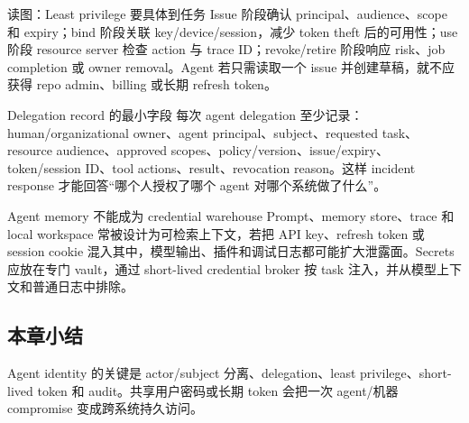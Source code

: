 
\begin{knowledgebox}{读图：Least privilege 要具体到任务}
Issue 阶段确认 principal、audience、scope 和 expiry；bind 阶段关联 key/device/session，减少 token theft 后的可用性；use 阶段 resource server 检查 action 与 trace ID；revoke/retire 阶段响应 risk、job completion 或 owner removal。Agent 若只需读取一个 issue 并创建草稿，就不应获得 repo admin、billing 或长期 refresh token。
\end{knowledgebox}

\begin{importantbox}{Delegation record 的最小字段}
每次 agent delegation 至少记录：human/organizational owner、agent principal、subject、requested task、resource audience、approved scopes、policy/version、issue/expiry、token/session ID、tool actions、result、revocation reason。这样 incident response 才能回答“哪个人授权了哪个 agent 对哪个系统做了什么”。
\end{importantbox}

\begin{warningbox}{Agent memory 不能成为 credential warehouse}
Prompt、memory store、trace 和 local workspace 常被设计为可检索上下文，若把 API key、refresh token 或 session cookie 混入其中，模型输出、插件和调试日志都可能扩大泄露面。Secrets 应放在专门 vault，通过 short-lived credential broker 按 task 注入，并从模型上下文和普通日志中排除。
\end{warningbox}

\subsection{本章小结}

Agent identity 的关键是 actor/subject 分离、delegation、least privilege、short-lived token 和 audit。共享用户密码或长期 token 会把一次 agent/机器 compromise 变成跨系统持久访问。

